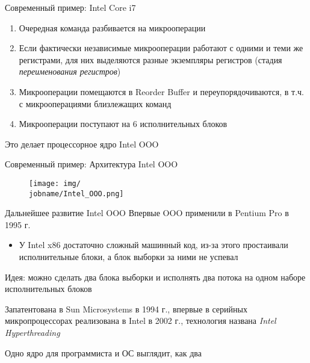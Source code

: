 \documentclass[xetex,aspectratio=43]{beamer}
\begin{document}
\begin{frame}{Современный пример: Intel Core i7}
        \begin{enumerate}
            \tightlist
            \item
            Очередная команда разбивается на микрооперации
            \item
            Если фактически независимые микрооперации работают с одними и теми же
            регистрами, для них выделяются разные экземпляры регистров (стадия
            \emph{переименования регистров})
            \item
            Микрооперации помещаются в Reorder Buffer и переупорядочиваются, в
            т.ч. с микрооперациями близлежащих команд
            \item
            Микрооперации поступают на 6 исполнительных блоков
        \end{enumerate}

        Это делает процессорное ядро Intel OOO
\end{frame}

\begin{frame}{Современный пример: Архитектура Intel OOO}
    \begin{figure}
        \texttt{[image: img/\\jobname/Intel\_OOO.png]}
    \end{figure}
\end{frame}

\begin{frame}{Дальнейшее развитие Intel OOO}
        Впервые OOO применили в Pentium Pro в 1995 г.

        \begin{itemize}
            \tightlist
            \item
            У Intel x86 достаточно сложный машинный код, из-за этого простаивали
            исполнительные блоки, а блок выборки за ними не успевал
        \end{itemize}

        \pause

        Идея: можно сделать два блока выборки и исполнять два потока на одном
        наборе исполнительных блоков

        Запатентована в Sun Microsystems в 1994 г., впервые в серийных
        микропроцессорах реализована в Intel в 2002 г., технология названа \emph{Intel
        Hyperthreading}

        Одно ядро для программиста и ОС выглядит, как два
\end{frame}
\end{document}
